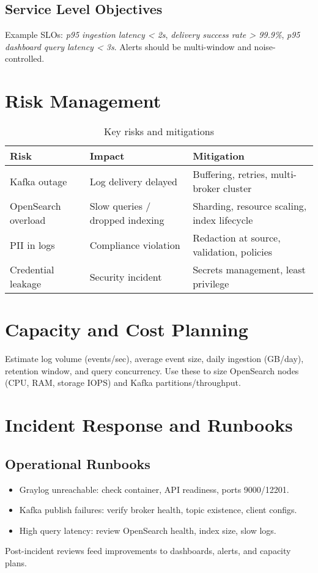 \documentclass[12pt,a4paper]{report}
\begin{document}
\section{Service Level Objectives}
Example SLOs: \textit{p95 ingestion latency < 2s}, \textit{delivery success rate > 99.9\%}, \textit{p95 dashboard query latency < 3s}. Alerts should be multi-window and noise-controlled.

\chapter{Risk Management}
\begin{table}[H]
\centering
\begin{tabular}{p{3.5cm} p{6.5cm} p{4.5cm}}
\toprule
\textbf{Risk} & \textbf{Impact} & \textbf{Mitigation} \\
\midrule
Kafka outage & Log delivery delayed & Buffering, retries, multi-broker cluster \\
OpenSearch overload & Slow queries / dropped indexing & Sharding, resource scaling, index lifecycle \\
PII in logs & Compliance violation & Redaction at source, validation, policies \\
Credential leakage & Security incident & Secrets management, least privilege \\
\bottomrule
\end{tabular}
\caption{Key risks and mitigations}
\end{table}

\chapter{Capacity and Cost Planning}
Estimate log volume (events/sec), average event size, daily ingestion (GB/day), retention window, and query concurrency. Use these to size OpenSearch nodes (CPU, RAM, storage IOPS) and Kafka partitions/throughput.

\chapter{Incident Response and Runbooks}
\section{Operational Runbooks}
\begin{itemize}[leftmargin=1.2cm]
  \item Graylog unreachable: check container, API readiness, ports 9000/12201.
  \item Kafka publish failures: verify broker health, topic existence, client configs.
  \item High query latency: review OpenSearch health, index size, slow logs.
\end{itemize}
Post-incident reviews feed improvements to dashboards, alerts, and capacity plans.
\end{document}
